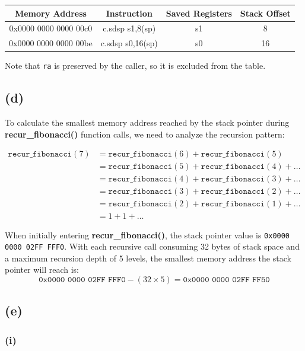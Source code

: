 \documentclass[12pt]{article}
\begin{document}
\begin{table}[H]
    \centering
    \begin{tabular}{|c|c|c|c|}
    \hline
    Memory Address & Instruction & Saved Registers & Stack Offset \\
    \hline
    0x0000 0000 0000 00c0 & c.sdsp s1,8(sp) & s1 & 8 \\
    \hline
    0x0000 0000 0000 00be & c.sdsp s0,16(sp) & s0 & 16 \\
    \hline
    \end{tabular}
\end{table}

Note that \texttt{ra} is preserved by the caller, so it is excluded from the table.

\subsection*{(d)}

To calculate the smallest memory address reached by the stack pointer during \textbf{recur\_fibonacci()} function calls, we need to analyze the recursion pattern:

\begin{align*}
\texttt{recur\_fibonacci}(7) &= \texttt{recur\_fibonacci}(6) + \texttt{recur\_fibonacci}(5) \\
&= \texttt{recur\_fibonacci}(5) + \texttt{recur\_fibonacci}(4) + \ldots \\
&= \texttt{recur\_fibonacci}(4) + \texttt{recur\_fibonacci}(3) + \ldots \\
&= \texttt{recur\_fibonacci}(3) + \texttt{recur\_fibonacci}(2) + \ldots \\
&= \texttt{recur\_fibonacci}(2) + \texttt{recur\_fibonacci}(1) + \ldots \\
&= 1 + 1 + \ldots
\end{align*}

When initially entering \textbf{recur\_fibonacci()}, the stack pointer value is \texttt{0x0000 0000 02FF FFF0}. With each recursive call consuming 32 bytes of stack space and a maximum recursion depth of 5 levels, the smallest memory address the stack pointer will reach is:
$$\texttt{0x0000 0000 02FF FFF0} - (32 \times 5) = \texttt{0x0000 0000 02FF FF50}$$

\subsection*{(e)}

\subsubsection*{(i)}
\end{document}
